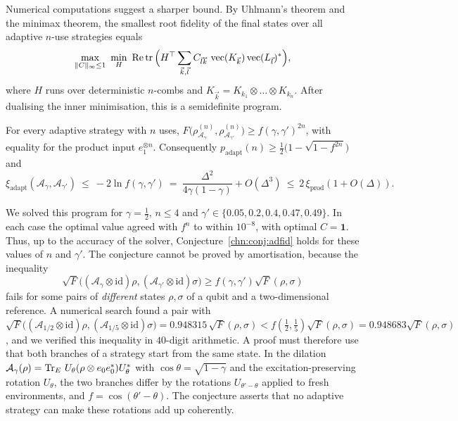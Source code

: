 Numerical computations suggest a sharper bound. By Uhlmann's theorem and the minimax theorem, the smallest root fidelity of the final states over all adaptive $n$-use strategies equals
\[
\max_{\|C\|_\infty\le1}\ \min_{H}\ \operatorname{Re}\tr\Big(H^{\top}\sum_{\vec k,\vec l}C_{\vec l\vec k}\,\vectorise(K_{\vec k})\vectorise(L_{\vec l})^*\Big),
\]
where $H$ runs over deterministic $n$-combs and $K_{\vec k}=K_{k_1}\otimes\dots\otimes K_{k_n}$. After dualising the inner minimisation, this is a semidefinite program.

\begin{conjecture}\label{chn:conj:adfid}
For every adaptive strategy with $n$ uses, $F\big(\rho^{(n)}_{\mathcal A_\gamma},\rho^{(n)}_{\mathcal A_{\gamma'}}\big)\ge f(\gamma,\gamma')^{2n}$, with equality for the product input $e_1^{\otimes n}$. Consequently $p_{\mathrm{adapt}}(n)\ge\frac12\big(1-\sqrt{1-f^{2n}}\big)$ and
\[
\xi_{\mathrm{adapt}}(\mathcal A_\gamma,\mathcal A_{\gamma'})\ \le\ -2\ln f(\gamma,\gamma')\ =\ \frac{\Delta^2}{4\gamma(1-\gamma)}+O(\Delta^3)\ \le\ 2\,\xi_{\mathrm{prod}}(1+O(\Delta)).
\]
\end{conjecture}

We solved this program for $\gamma=\frac12$, $n\le4$ and $\gamma'\in\{0.05,0.2,0.4,0.47,0.49\}$. In each case the optimal value agreed with $f^n$ to within $10^{-8}$, with optimal $C=\mathbf 1$. Thus, up to the accuracy of the solver, Conjecture~\ref{chn:conj:adfid} holds for these values of $n$ and $\gamma'$. The conjecture cannot be proved by amortisation, because the inequality
\[
\sqrt F\big((\mathcal A_\gamma\otimes\mathrm{id})\rho,(\mathcal A_{\gamma'}\otimes\mathrm{id})\sigma\big)\ge f(\gamma,\gamma')\sqrt F(\rho,\sigma)
\]
fails for some pairs of \emph{different} states $\rho,\sigma$ of a qubit and a two-dimensional reference. A numerical search found a pair with $\sqrt{F}\big((\mathcal A_{1/2}\otimes\mathrm{id})\rho,(\mathcal A_{1/5}\otimes\mathrm{id})\sigma\big)=0.948315\,\sqrt{F}(\rho,\sigma)<f(\tfrac12,\tfrac15)\sqrt F(\rho,\sigma)=0.948683\sqrt F(\rho,\sigma)$, and we verified this inequality in $40$-digit arithmetic. A proof must therefore use that both branches of a strategy start from the same state. In the dilation $\mathcal A_\gamma(\rho)=\operatorname{Tr}_E\,U_\theta(\rho\otimes e_0e_0^*)U_\theta^*$ with $\cos\theta=\sqrt{1-\gamma}$ and the excitation-preserving rotation $U_\theta$, the two branches differ by the rotations $U_{\theta'-\theta}$ applied to fresh environments, and $f=\cos(\theta'-\theta)$. The conjecture asserts that no adaptive strategy can make these rotations add up coherently.

